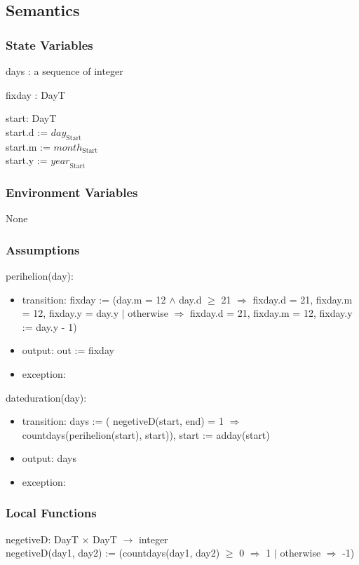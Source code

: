 \documentclass[12pt, titlepage]{article}
\begin{document}
\subsection{Semantics}

\subsubsection{State Variables}
days : a sequence of integer

fixday : DayT

start: DayT\\
start.d := $\mathit{day}_\text{Start}$\\
start.m := $\mathit{month}_\text{Start}$\\
start.y := $\mathit{year}_\text{Start}$\\

\subsubsection{Environment Variables}

None

\subsubsection{Assumptions}

\noindent perihelion(day):
\begin{itemize}
\item transition: fixday :=  (day.m = 12 $	\wedge$ day.d $\geq	$ 21 $\Rightarrow$ fixday.d = 21, fixday.m = 12, fixday.y = day.y $|$ otherwise $\Rightarrow$ fixday.d = 21, fixday.m = 12, fixday.y := day.y - 1)
\item output: out := fixday
\item exception: 
\end{itemize}

\noindent dateduration(day):
\begin{itemize}
\item transition: days := ( negetiveD(start, end) = 1 $\Rightarrow$  countdays(perihelion(start), start)), start := adday(start)
\item output: days
\item exception: 
\end{itemize}


\subsubsection{Local Functions}
negetiveD: DayT $\times$ DayT $\rightarrow $ integer\\
negetiveD(day1, day2) := (countdays(day1, day2) $\geq$ 0 $\Rightarrow$ 1 $|$ otherwise $\Rightarrow$ -1)
\end{document}
